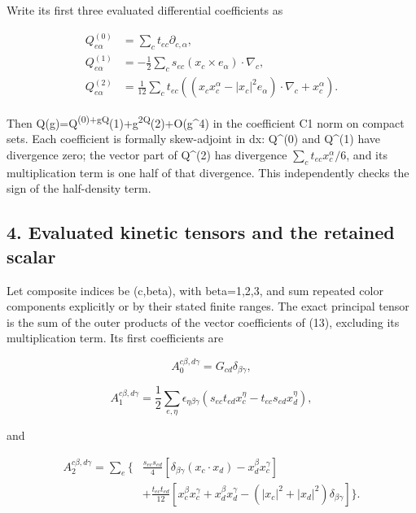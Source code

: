 \documentclass[
  11pt,
]{article}
\begin{document}
Write its first three evaluated differential coefficients as

\[
 \begin{split}
 Q^{(0)}_{e\alpha}&=\sum_ct_{ec}\partial_{c,\alpha},\\
 Q^{(1)}_{e\alpha}&=-\frac12\sum_cs_{ec}
                         (x_c\times e_\alpha)\cdot\nabla_c,\\
 Q^{(2)}_{e\alpha}&=\frac1{12}\sum_ct_{ec}
       \left((x_c x_c^\alpha-|x_c|^2e_\alpha)\cdot\nabla_c
                           +x_c^\alpha\right).
 \end{split}                                                \tag{14}
\]

Then
Q(g)=Q\textsuperscript{(0)+gQ}(1)+g\textsuperscript{2Q}(2)+O(g\^{}4) in
the coefficient C1 norm on compact sets. Each coefficient is formally
skew-adjoint in dx: Q\^{}(0) and Q\^{}(1) have divergence zero; the
vector part of Q\^{}(2) has divergence \(\sum_ct_{ec}x_c^\alpha/6\), and
its multiplication term is one half of that divergence. This
independently checks the sign of the half-density term.

\subsection{4. Evaluated kinetic tensors and the retained
scalar}\label{weak-coupling-part-14-evaluated-kinetic-tensors-and-the-retained-scalar}

Let composite indices be (c,beta), with beta=1,2,3, and sum repeated
color components explicitly or by their stated finite ranges. The exact
principal tensor is the sum of the outer products of the vector
coefficients of (13), excluding its multiplication term. Its first
coefficients are

\[
 A_0^{c\beta,d\gamma}=G_{cd}\delta_{\beta\gamma},           \tag{15}
\]

\[
 \boxed{A_1^{c\beta,d\gamma}
 =\frac12\sum_{e,\eta}\epsilon_{\eta\beta\gamma}
       (s_{ec}t_{ed}x_c^\eta-t_{ec}s_{ed}x_d^\eta),}          \tag{16}
\]

and

\[
 \boxed{\begin{split}
 A_2^{c\beta,d\gamma}=\sum_e\Big\{
 &\frac{s_{ec}s_{ed}}4
       [\delta_{\beta\gamma}(x_c\cdot x_d)
                                      -x_d^\beta x_c^\gamma]\\
 &+\frac{t_{ec}t_{ed}}{12}
       [x_c^\beta x_c^\gamma+x_d^\beta x_d^\gamma
          -( |x_c|^2+|x_d|^2)\delta_{\beta\gamma}]
                       \Big\} .
 \end{split}}                                                \tag{17}
\]
\end{document}
